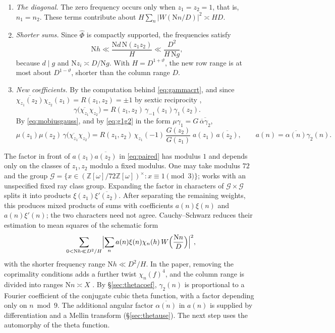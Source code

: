 \documentclass[11pt]{article}
\numberwithin{equation}{section}
\newcommand{\N}{\mathrm N}
\newcommand{\OO}{\mathbb Z[\omega]}
\theoremstyle{definition}
\theoremstyle{remark}
\begin{document}
\begin{enumerate}
\item \emph{The diagonal.} The zero frequency occurs only when $z_1=z_2=1$, that is, $n_1=n_2$. These terms
contribute about $H\sum_n|W(\N n/D)|^2\asymp HD$.
\item \emph{Shorter sums.} Since $\widehat\Phi$ is compactly supported, the frequencies satisfy
\begin{equation}\label{eq:dualrange}
 \N h\ll\frac{\N d\,\N(z_1z_2)}H\ll\frac{D^2}{H\,\N g},
\end{equation}
because $d\mid g$ and $\N z_i\asymp D/\N g$. With $H=D^{1+\vartheta}$, the new row range is at most about
$D^{1-\vartheta}$, shorter than the column range $D$.
\item \emph{New coefficients.} By the computation behind \eqref{eq:gammacrt}, and since $\overline{\chi_{z_1}(z_2)}\chi_{z_2}(z_1)=R(z_1,z_2)=\pm1$
by sextic reciprocity \cite[(4.1)]{QRH},
\begin{equation}\label{eq:pairedgauss}
 \gamma\bigl(\overline{\chi_{z_1}}\chi_{z_2}\bigr)=R(z_1,z_2)\,\gamma_{-1}(z_1)\gamma_1(z_2).
\end{equation}
By \eqref{eq:mobiusgauss}, and by \eqref{eq:g1g2} in the form $\mu\gamma_1=G\,\overline{\overline\alpha\gamma_2}$,
\begin{equation}\label{eq:paired}
 \mu(z_1)\mu(z_2)\,\gamma\bigl(\overline{\chi_{z_1}}\chi_{z_2}\bigr)
 =R(z_1,z_2)\,\chi_{z_1}(-1)\,\frac{G(z_2)}{G(z_1)}\;
 a(z_1)\,\overline{a(z_2)},\qquad a(n)=\overline{\alpha(n)}\gamma_2(n).
\end{equation}
\end{enumerate}
The factor in front of $a(z_1)\overline{a(z_2)}$ in \eqref{eq:paired} has modulus $1$ and depends only on the classes of $z_1,z_2$
modulo a fixed modulus. One may take modulus $72$ and the group
$\mathcal G=\{x\in(\OO/72\OO)^\times:x\equiv1\pmod3\}$; \cite[\S4.1]{QRH} works with an unspecified fixed ray class group.
Expanding the factor in characters of $\mathcal G\times\mathcal G$ splits it into products
$\xi(z_1)\overline{\xi'(z_2)}$. After separating the remaining weights, this produces mixed products of
sums with coefficients $a(n)\xi(n)$ and $a(n)\xi'(n)$; the two characters need not agree.
Cauchy--Schwarz reduces their estimation to mean squares of the schematic form
\begin{equation}\label{eq:dualms}
 \sum_{0<\N h\ll D^2/H}\Bigl|\sum_n a(n)\xi(n)\chi_n(h)\,W\Bigl(\frac{\N n}D\Bigr)\Bigr|^2,
\end{equation}
with the shorter frequency range $\N h\ll D^2/H$. In the paper, removing the coprimality conditions adds a
further twist $\chi_n(f)^4$, and the column range is divided into ranges $\N n\asymp X$ \cite[\S4]{QRH}.
By \S\ref{sec:thetacoef}, $\gamma_2(n)$ is proportional to a Fourier coefficient of the conjugate cubic
theta function, with a factor depending only on $n\bmod9$. The additional angular factor
$\overline{\alpha(n)}$ in $a(n)$ is supplied by differentiation and a Mellin transform
(\S\ref{sec:thetause}). The next step uses the automorphy of the theta function.
\end{document}
